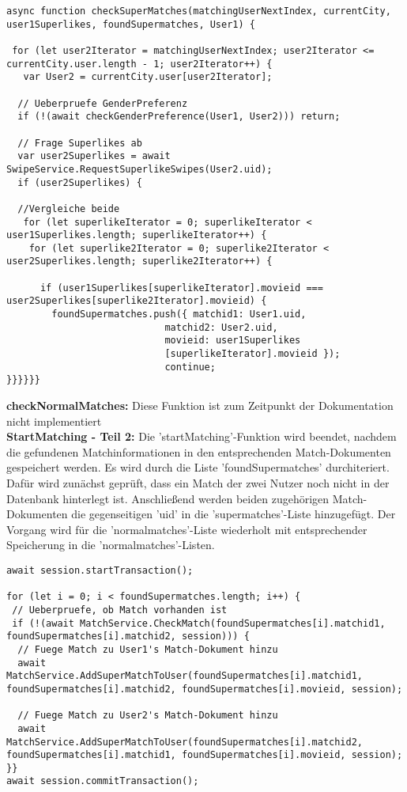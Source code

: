 \begin{lstlisting}[caption=matchManager.js - checkSuperMatches, label=lst:checkSuperMatches]
async function checkSuperMatches(matchingUserNextIndex, currentCity, user1Superlikes, foundSupermatches, User1) {

 for (let user2Iterator = matchingUserNextIndex; user2Iterator <= currentCity.user.length - 1; user2Iterator++) {
   var User2 = currentCity.user[user2Iterator];
   
  // Ueberpruefe GenderPreferenz
  if (!(await checkGenderPreference(User1, User2))) return;
  
  // Frage Superlikes ab
  var user2Superlikes = await SwipeService.RequestSuperlikeSwipes(User2.uid);
  if (user2Superlikes) {
        
  //Vergleiche beide
   for (let superlikeIterator = 0; superlikeIterator < user1Superlikes.length; superlikeIterator++) {
    for (let superlike2Iterator = 0; superlike2Iterator < user2Superlikes.length; superlike2Iterator++) {
    
      if (user1Superlikes[superlikeIterator].movieid === user2Superlikes[superlike2Iterator].movieid) {
        foundSupermatches.push({ matchid1: User1.uid,
                            matchid2: User2.uid, 
                            movieid: user1Superlikes
                            [superlikeIterator].movieid });
                            continue;
}}}}}}
\end{lstlisting}

\noindent
\textbf{checkNormalMatches:}
Diese Funktion ist zum Zeitpunkt der Dokumentation nicht implementiert \\

\noindent
\textbf{StartMatching - Teil 2:}
Die 'startMatching'-Funktion wird beendet, nachdem die gefundenen Matchinformationen in den entsprechenden Match-Dokumenten gespeichert werden. Es wird durch die Liste 'foundSupermatches' durchiteriert. Dafür wird zunächst geprüft, dass ein Match der zwei Nutzer noch nicht in der Datenbank hinterlegt ist. Anschließend werden beiden zugehörigen Match-Dokumenten die gegenseitigen 'uid' in die 'supermatches'-Liste hinzugefügt.
Der Vorgang wird für die 'normalmatches'-Liste wiederholt mit entsprechender Speicherung in die 'normalmatches'-Listen.

\begin{lstlisting}[caption=matchManager.js - startMatching - Teil 2: Speichere Matches, label=lst:startMatchingteil2]
await session.startTransaction();

for (let i = 0; i < foundSupermatches.length; i++) {        
 // Ueberpruefe, ob Match vorhanden ist
 if (!(await MatchService.CheckMatch(foundSupermatches[i].matchid1,   foundSupermatches[i].matchid2, session))) {
  // Fuege Match zu User1's Match-Dokument hinzu
  await MatchService.AddSuperMatchToUser(foundSupermatches[i].matchid1, foundSupermatches[i].matchid2, foundSupermatches[i].movieid, session);

  // Fuege Match zu User2's Match-Dokument hinzu
  await MatchService.AddSuperMatchToUser(foundSupermatches[i].matchid2,  foundSupermatches[i].matchid1, foundSupermatches[i].movieid, session);
}}
await session.commitTransaction();
\end{lstlisting}